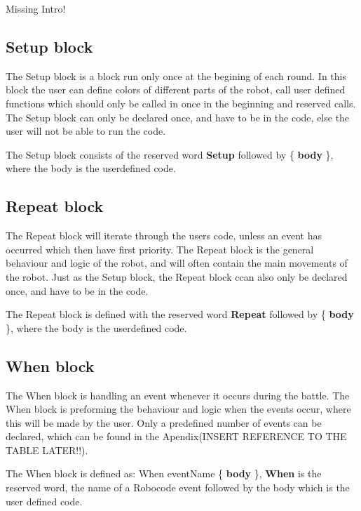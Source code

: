 Missing Intro!

\subsection{Setup block}
The Setup block is a block run only once at the begining of each round. In this block the user can define colors of different parts of the robot, call user defined functions which should only be called in once in the beginning and reserved calls. The Setup block can only be declared once, and have to be in the code, else the user will not be able to run the code.

\begin{defi}
The Setup block consists of the reserved word \textbf{Setup} followed by \{ \textbf{body} \}, where the body is the userdefined code. 
\end{defi}

\subsection{Repeat block}
The Repeat block will iterate through the users code, unless an event has occurred which then have first priority. The Repeat block is the general behaviour and logic of the robot, and will often contain the main movements of the robot. Just as the Setup block, the Repeat block ccan also only be declared once, and have to be in the code.

\begin{defi}
The Repeat block is defined with the reserved word \textbf{Repeat} followed by \{ \textbf{body} \}, where the body is the userdefined code.
\end{defi}
\subsection{When block}
The When block is handling an event whenever it occurs during the battle. The When block is preforming the behaviour and logic when the events occur, where this will be made by the user. Only a predefined number of events can be declared, which can be found in the Apendix(INSERT REFERENCE TO THE TABLE LATER!!).

\begin{defi}
The When block is defined as: When eventName \{ \textbf{body} \}, \textbf{When} is the reserved word, the name of a Robocode event followed by the body which is the user defined code.
\end{defi}
